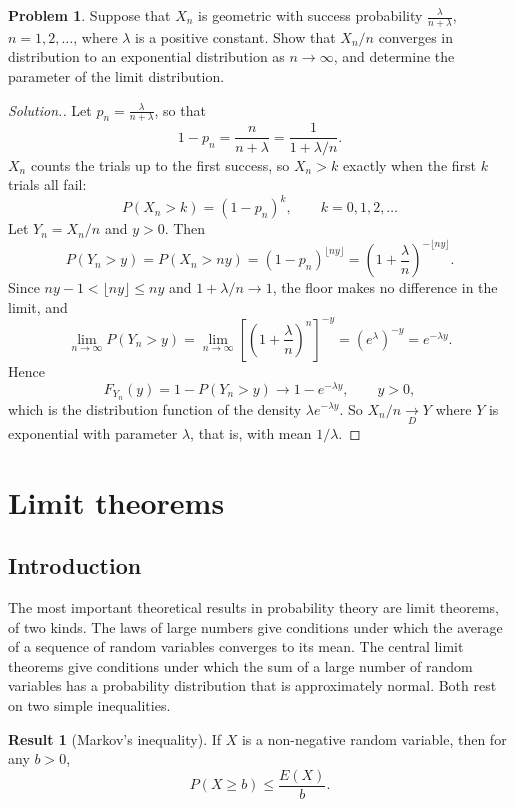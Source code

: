 \documentclass[11pt,a4paper]{article}
\theoremstyle{definition}
\newtheorem{result}[thm]{Result}
\newtheorem{problemx}{Problem}[subsection]
\newenvironment{problem}{\begin{problemx}}{\end{problemx}}
\newenvironment{solution}
  {\renewcommand{\qedsymbol}{}\begin{proof}[\textit{Solution}.]}
  {\end{proof}}
\begin{document}
\begin{problem}
Suppose that $X_n$ is geometric with success probability
$\frac{\lambda}{n+\lambda}$, $n=1,2,\dots$, where $\lambda$ is a positive
constant. Show that $X_n/n$ converges in distribution to an exponential
distribution as $n\rightarrow\infty$, and determine the parameter of the limit
distribution.
\end{problem}
\begin{solution}
Let $p_n = \frac{\lambda}{n+\lambda}$, so that
$$1-p_n = \frac{n}{n+\lambda} = \frac{1}{1+\lambda/n}.$$
$X_n$ counts the trials up to the first success, so $X_n>k$ exactly when the
first $k$ trials all fail:
$$P(X_n>k) = (1-p_n)^{k},\qquad k=0,1,2,\dots$$
Let $Y_n = X_n/n$ and $y>0$. Then
$$P(Y_n>y) = P(X_n>ny) = (1-p_n)^{\lfloor ny\rfloor}
= \left(1+\frac{\lambda}{n}\right)^{-\lfloor ny\rfloor}.$$
Since $ny-1<\lfloor ny\rfloor\leq ny$ and $1+\lambda/n\rightarrow1$, the floor
makes no difference in the limit, and
$$\lim_{n\rightarrow\infty}P(Y_n>y)
= \lim_{n\rightarrow\infty}\left[\left(1+\frac{\lambda}{n}\right)^{n}\right]^{-y}
= \left(e^{\lambda}\right)^{-y} = e^{-\lambda y}.$$
Hence
$$F_{Y_n}(y) = 1-P(Y_n>y)\longrightarrow1-e^{-\lambda y},\qquad y>0 ,$$
which is the distribution function of the density $\lambda e^{-\lambda y}$. So
$X_n/n\underset{D}{\longrightarrow}Y$ where $Y$ is exponential with parameter
$\lambda$, that is, with mean $1/\lambda$.
\end{solution}


\section{Limit theorems}
\subsection{Introduction}
The most important theoretical results in probability theory are limit theorems, of two kinds. The laws of large
numbers give conditions under which the average of a sequence of random variables converges to its mean. The
central limit theorems give conditions under which the sum of a large number of random variables has a probability
distribution that is approximately normal. Both rest on two simple inequalities.

\begin{result}[Markov's inequality]\label{res:markov}
If $X$ is a non-negative random variable, then for any $b > 0$,
\[
P(X \ge b) \le \frac{E(X)}{b} .
\]
\end{result}
\end{document}

